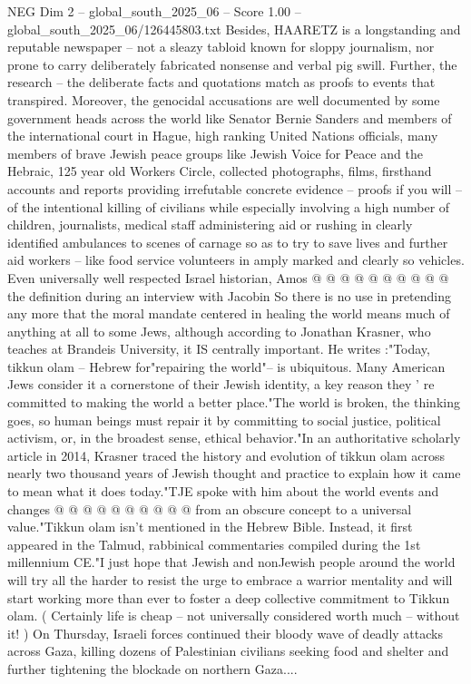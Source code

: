 \begin{textsample}{NEG Dim 2 – global\_south\_2025\_06 – Score 1.00 – global\_south\_2025\_06/126445803.txt}  \label{ex:f2_neg_195}
Besides, HAARETZ is a longstanding and reputable newspaper -- not a sleazy tabloid known for sloppy journalism, nor prone to carry deliberately fabricated nonsense and verbal pig swill.
Further, the research -- the deliberate facts and quotations match as proofs to events that transpired.
Moreover, the genocidal accusations are well documented by some government heads across the world like Senator Bernie Sanders and members of the international court in Hague, high ranking United Nations officials, many members of brave Jewish peace groups like Jewish Voice for Peace and the Hebraic, 125 year old Workers Circle, collected photographs, films, firsthand accounts and reports providing irrefutable concrete evidence -- proofs if you will -- of the intentional killing of civilians while especially involving a high number of children, journalists, medical staff administering aid or rushing in clearly identified ambulances to scenes of carnage so as to try to save lives and further aid workers -- like food service volunteers in amply marked and clearly so vehicles.
Even universally well respected Israel historian, Amos @ @ @ @ @ @ @ @ @ @ the definition during an interview with Jacobin So there is no use in pretending any more that the moral mandate centered in healing the world means much of anything at all to some Jews, although according to Jonathan Krasner, who teaches at Brandeis University, it IS centrally important.
He writes :"Today, tikkun olam -- Hebrew for"repairing the world"-- is ubiquitous.
Many American Jews consider it a cornerstone of their Jewish identity, a key reason they ' re committed to making the world a better place."The world is broken, the thinking goes, so human beings must repair it by committing to social justice, political activism, or, in the broadest sense, ethical behavior."In an authoritative scholarly article in 2014, Krasner traced the history and evolution of tikkun olam across nearly two thousand years of Jewish thought and practice to explain how it came to mean what it does today."TJE spoke with him about the world events and changes @ @ @ @ @ @ @ @ @ @ from an obscure concept to a universal value."Tikkun olam isn't mentioned in the Hebrew Bible.
Instead, it first appeared in the Talmud, rabbinical commentaries compiled during the 1st millennium CE."I just hope that Jewish and nonJewish people around the world will try all the harder to resist the urge to embrace a warrior mentality and will start working more than ever to foster a deep collective commitment to Tikkun olam. ( Certainly life is cheap -- not universally considered worth much -- without it! ) On Thursday, Israeli forces continued their bloody wave of deadly attacks across Gaza, killing dozens of Palestinian civilians seeking food and shelter and further tightening the blockade on northern Gaza....

\end{textsample}
